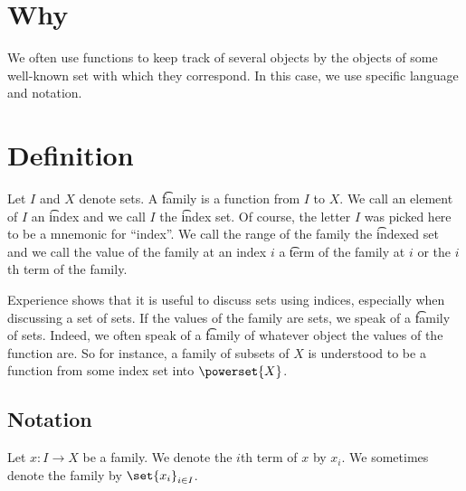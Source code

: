 

\section*{Why}

We often use functions to keep track of several objects by the objects of some well-known set with which they correspond.
In this case, we use specific language and notation.

\section*{Definition}

Let $I$ and $X$ denote sets.
A \t{family} is a function from $I$ to $X$.
We call an element of $I$ an \t{index} and we call $I$ the \t{index set}.
Of course, the letter $I$ was picked here to be a mnemonic for ``index''.
We call the range of the family the \t{indexed set} and we call the value of the family at an index $i$ a \t{term} of the family at $i$ or the \t{$i$th term} of the family.

Experience shows that it is useful to discuss sets using indices, especially when discussing a set of sets.
If the values of the family are sets, we speak of a \t{family of sets}.
Indeed, we often speak of a \t{family of} whatever object the values of the function are.
So for instance, a family of subsets of $X$ is understood to be a function from some index set into $\powerset{X}$.


\subsection*{Notation}

Let $x: I \to X$ be a family.
We denote the $i$th term of $x$ by $x_i$.
We sometimes denote the family by $\set{x_i}_{i \in I}$.

\blankpage